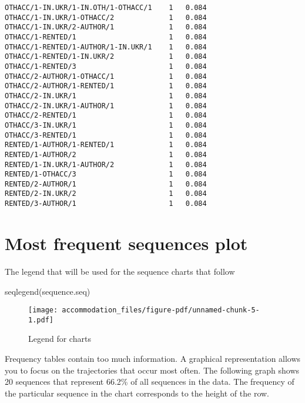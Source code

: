 \documentclass[
  letterpaper,
  DIV=11,
  numbers=noendperiod]{scrreprt}
\newenvironment{Shaded}{\begin{snugshade}}{\end{snugshade}}
\newcommand{\FunctionTok}[1]{\textcolor[rgb]{0.28,0.35,0.67}{#1}}
\newcommand{\NormalTok}[1]{\textcolor[rgb]{0.00,0.23,0.31}{#1}}
\begin{document}
\begin{verbatim}
OTHACC/1-IN.UKR/1-IN.OTH/1-OTHACC/1    1   0.084
OTHACC/1-IN.UKR/1-OTHACC/2             1   0.084
OTHACC/1-IN.UKR/2-AUTHOR/1             1   0.084
OTHACC/1-RENTED/1                      1   0.084
OTHACC/1-RENTED/1-AUTHOR/1-IN.UKR/1    1   0.084
OTHACC/1-RENTED/1-IN.UKR/2             1   0.084
OTHACC/1-RENTED/3                      1   0.084
OTHACC/2-AUTHOR/1-OTHACC/1             1   0.084
OTHACC/2-AUTHOR/1-RENTED/1             1   0.084
OTHACC/2-IN.UKR/1                      1   0.084
OTHACC/2-IN.UKR/1-AUTHOR/1             1   0.084
OTHACC/2-RENTED/1                      1   0.084
OTHACC/3-IN.UKR/1                      1   0.084
OTHACC/3-RENTED/1                      1   0.084
RENTED/1-AUTHOR/1-RENTED/1             1   0.084
RENTED/1-AUTHOR/2                      1   0.084
RENTED/1-IN.UKR/1-AUTHOR/2             1   0.084
RENTED/1-OTHACC/3                      1   0.084
RENTED/2-AUTHOR/1                      1   0.084
RENTED/2-IN.UKR/2                      1   0.084
RENTED/3-AUTHOR/1                      1   0.084
\end{verbatim}

\section{Most frequent sequences
plot}\label{most-frequent-sequences-plot}

The legend that will be used for the sequence charts that follow

\begin{Shaded}
\begin{Highlighting}[]
\FunctionTok{seqlegend}\NormalTok{(sequence.seq)}
\end{Highlighting}
\end{Shaded}

\begin{figure}[H]

{\centering \texttt{[image: accommodation\_files/figure-pdf/unnamed-chunk-5-1.pdf]}

}

\caption{Legend for charts}

\end{figure}%

Frequency tables contain too much information. A graphical
representation allows you to focus on the trajectories that occur most
often. The following graph shows 20 sequences that represent 66.2\% of
all sequences in the data. The frequency of the particular sequence in
the chart corresponds to the height of the row.
\end{document}
